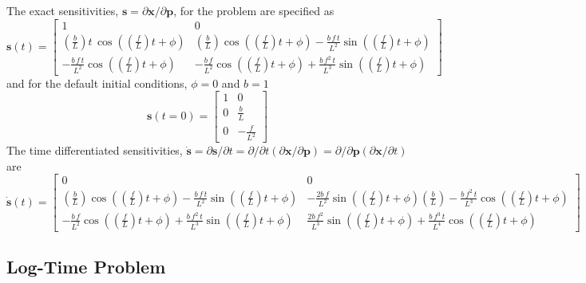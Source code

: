 The exact sensitivities, $\mathbf{s}=\partial\mathbf{x}/\partial\mathbf{p}$,
for the problem are specified as
\[
\mathbf{s}(t)=\left[\begin{array}{cc}
1 & 0\\
\left(\frac{b}{L}\right)t\,\cos\left(\left(\frac{f}{L}\right)t+\phi\right) & \left(\frac{b}{L}\right)\cos\left(\left(\frac{f}{L}\right)t+\phi\right)-\frac{b\,f\,t}{L^{2}}\sin\left(\left(\frac{f}{L}\right)t+\phi\right)\\
-\frac{b\,f\,t}{L^{2}}\cos\left(\left(\frac{f}{L}\right)t+\phi\right) & -\frac{b\,f}{L^{2}}\cos\left(\left(\frac{f}{L}\right)t+\phi\right)+\frac{b\,f^{2}\,t}{L^{3}}\sin\left(\left(\frac{f}{L}\right)t+\phi\right)
\end{array}\right]
\]
and for the default initial conditions, $\phi=0$ and $b=1$
\[
\mathbf{s}(t=0)=\left[\begin{array}{cc}
1 & 0\\
0 & \frac{b}{L}\\
0 & -\frac{f}{L^{2}}
\end{array}\right]
\]
The time differentiated sensitivities, $\dot{\mathbf{s}}=\partial\mathbf{s}/\partial t=\partial/\partial t(\partial\mathbf{x}/\partial\mathbf{p})=\partial/\partial\mathbf{p}(\partial\mathbf{x}/\partial t)$
are
\[
\dot{\mathbf{s}}(t)=\left[\begin{array}{cc}
0 & 0\\
\left(\frac{b}{L}\right)\cos\left(\left(\frac{f}{L}\right)t+\phi\right)-\frac{b\,f\,t}{L^{2}}\sin\left(\left(\frac{f}{L}\right)t+\phi\right) & -\frac{2b\,f}{L^{2}}\sin\left(\left(\frac{f}{L}\right)t+\phi\right)\left(\frac{b}{L}\right)-\frac{b\,f^{2}\,t}{L^{3}}\cos\left(\left(\frac{f}{L}\right)t+\phi\right)\\
-\frac{b\,f}{L^{2}}\cos\left(\left(\frac{f}{L}\right)t+\phi\right)+\frac{b\,f^{2}\,t}{L^{3}}\sin\left(\left(\frac{f}{L}\right)t+\phi\right) & \frac{2b\,f^{2}}{L^{3}}\sin\left(\left(\frac{f}{L}\right)t+\phi\right)+\frac{b\,f^{3}\,t}{L^{4}}\cos\left(\left(\frac{f}{L}\right)t+\phi\right)
\end{array}\right]
\]


\subsection{Log-Time Problem\label{rythmos:sec:Log-Time-Problem}}

